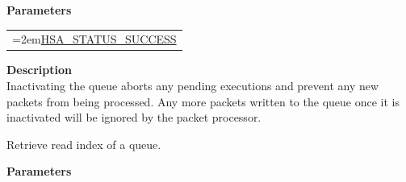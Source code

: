 \documentclass[final]{book}
\newcommand{\hsaarg}[1]{\textit{#1}}
\begin{document}
\begin{appendices}
\noindent\textbf{Parameters}\\[-6mm]
\noindent\begin{longtable}{@{}>{\hangindent=2em}p{\textwidth}}
\hsaarg{queue}\\\hspace{2em}(in) Queue.
\end{longtable}
\vspace{-5mm}\noindent\textbf{Return Values}\\[-6mm]
\noindent\begin{longtable}{@{}>{\hangindent=2em}p{\linewidth}}
\hyperlink{group--status-1ggad755322e7ff95456520e8abdbe90d225ae382ea0c9c05cce5a60d0317375159cc}{HSA_STATUS_SUCCESS}
\end{longtable}
\vspace{-4mm}\noindent\textbf{Description}\\[1mm]
Inactivating the queue aborts any pending executions and prevent any new packets from being processed. Any more packets written to the queue once it is inactivated will be ignored by the packet processor. 


\noindent{}
Retrieve read index of a queue.

\noindent\textbf{Parameters}\\[-6mm]
\noindent\begin{longtable}{@{}>{\hangindent=2em}p{\textwidth}}
\hsaarg{queue}\\\hspace{2em}(in) Queue.
\end{longtable}
\vspace{-5mm}\noindent\textbf{Returns}\\[1mm]
Read index.

\noindent\begin{longtable}{@{}>{\hangindent=2em}p{\linewidth}}

\end{longtable}
 



\end{appendices}
\end{document}
